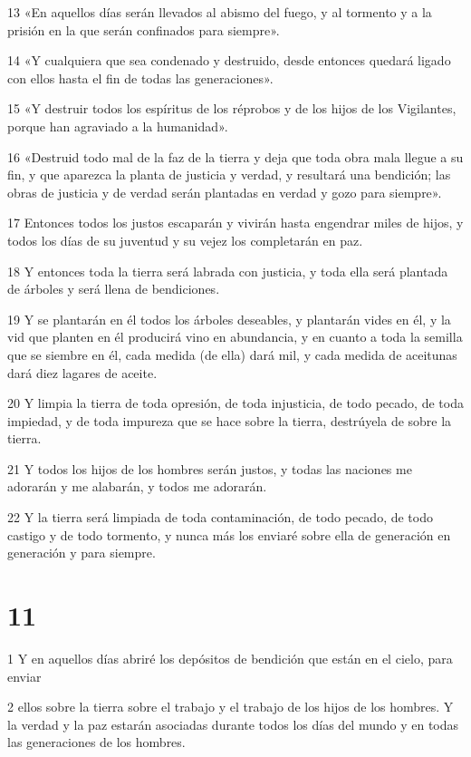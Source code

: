 \par 13 «En aquellos días serán llevados al abismo del fuego, y al tormento y a la prisión en la que serán confinados para siempre».
\par 14 «Y cualquiera que sea condenado y destruido, desde entonces quedará ligado con ellos hasta el fin de todas las generaciones».
\par 15 «Y destruir todos los espíritus de los réprobos y de los hijos de los Vigilantes, porque han agraviado a la humanidad».
\par 16 «Destruid todo mal de la faz de la tierra y deja que toda obra mala llegue a su fin, y que aparezca la planta de justicia y verdad, y resultará una bendición; las obras de justicia y de verdad serán plantadas en verdad y gozo para siempre».
\par 17 Entonces todos los justos escaparán y vivirán hasta engendrar miles de hijos, y todos los días de su juventud y su vejez los completarán en paz.
\par 18 Y entonces toda la tierra será labrada con justicia, y toda ella será plantada de árboles y será llena de bendiciones.
\par 19 Y se plantarán en él todos los árboles deseables, y plantarán vides en él, y la vid que planten en él producirá vino en abundancia, y en cuanto a toda la semilla que se siembre en él, cada medida (de ella) dará mil, y cada medida de aceitunas dará diez lagares de aceite.
\par 20 Y limpia la tierra de toda opresión, de toda injusticia, de todo pecado, de toda impiedad, y de toda impureza que se hace sobre la tierra, destrúyela de sobre la tierra.
\par 21 Y todos los hijos de los hombres serán justos, y todas las naciones me adorarán y me alabarán, y todos me adorarán.
\par 22 Y la tierra será limpiada de toda contaminación, de todo pecado, de todo castigo y de todo tormento, y nunca más los enviaré sobre ella de generación en generación y para siempre.

\chapter{11}

\par 1 Y en aquellos días abriré los depósitos de bendición que están en el cielo, para enviar
\par 2 ellos sobre la tierra sobre el trabajo y el trabajo de los hijos de los hombres. Y la verdad y la paz estarán asociadas durante todos los días del mundo y en todas las generaciones de los hombres.

